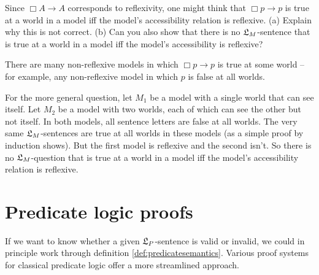 \begin{exercise}
  Since $\Box A \to A$ corresponds to reflexivity, one might think that
  $\Box p \to p$ is true at a world in a model iff the model's accessibility
  relation is reflexive. (a) Explain why this is not correct. (b) Can you also
  show that there is no $\mathfrak{L}_{M}$-sentence that is true at a world in a model iff
  the model's accessibility is reflexive?
\end{exercise}
\begin{solution}
  There are many non-reflexive models in which $\Box p \to p$ is true at some
  world -- for example, any non-reflexive model in which $p$ is false at all
  worlds.

  For the more general question, let $M_1$ be a model with a single world that
  can see itself. Let $M_{2}$ be a model with two worlds, each of which can see
  the other but not itself. In both models, all sentence letters are false at
  all worlds. The very same $\mathfrak{L}_M$-sentences are true at all worlds in these
  models (as a simple proof by induction shows). But the first model is
  reflexive and the second isn't. So there is no $\mathfrak{L}_{M}$-question that is true
  at a world in a model iff the model's accessibility relation is reflexive.
\end{solution}




\section{Predicate logic proofs}

If we want to know whether a given $\mathfrak{L}_{P}$-sentence is valid or invalid, we
could in principle work through definition \ref{def:predicatesemantics}. Various
proof systems for classical predicate logic offer a more streamlined approach.

